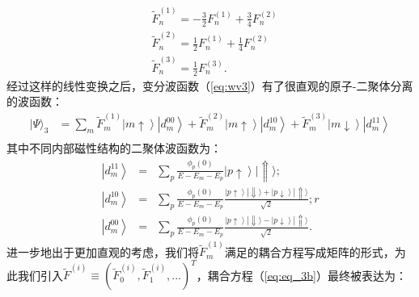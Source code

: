 \begin{equation}
    \begin{split}
        &\tilde{F}^{(1)}_n =-\frac{3}{2}F_n^{(1)} +\frac{3}{4}F_n^{(2)}\\
        &\tilde{F}^{(2)}_n =\frac{1}{2}F_n^{(1)}+\frac{1}{4}F_n^{(2)} \\
        &\tilde{F}^{(3)}_n =\frac{1}{2}F_n^{(3)}.
    \end{split} \label{tF}
\end{equation}
经过这样的线性变换之后，变分波函数（\ref{eq:wv3}）有了很直观的原子-二聚体分离的波函数：
 \begin{equation}
    \begin{split}
        |\Psi\rangle_3 &=\sum_m \tilde{F}^{(1)}_m \left| m \uparrow \right> \left|d^{00}_{m}\right> + \tilde{F}^{(2)}_m \left|m\uparrow \right>  \left| d^{10}_{m}\right> +   \tilde{F}^{(3)}_m \left|m\downarrow\right> \left|d^{11}_{m}\right>\\
    \end{split}
    \end{equation}
其中不同内部磁性结构的二聚体波函数为：
\begin{eqnarray}
    \left|d^{11}_{m}\right> &=& \sum_p \frac{\phi_p(0)}{E-E_m-E_p} \left| p\uparrow \right>|\Uparrow\rangle ;\\
    \left|d^{10}_{m}\right> &=& \sum_p \frac{\phi_p(0)}{E-E_m-E_p} \frac{\left| p\uparrow \right>|\Downarrow\rangle+\left| p\downarrow \right>|\Uparrow\rangle}{\sqrt{2}} ;r\\
\left|d^{00}_{m}\right> &=& \sum_p \frac{\phi_p(0)}{E-E_m-E_p} \frac{\left| p\uparrow \right>|\Downarrow\rangle-\left| p\downarrow \right>|\Uparrow\rangle}{\sqrt{2}}. 
\end{eqnarray}
进一步地出于更加直观的考虑，我们将$\tilde{F}^{(1)}_m$满足的耦合方程写成矩阵的形式，为此我们引入$\tilde{F}^{(i)}\equiv (\tilde{F}^{(i)}_0,\tilde{F}^{(i)}_1,...)^T$，耦合方程（\ref{eq:eq_3b}）最终被表达为：
